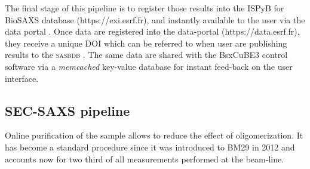 \documentclass[preprint]{iucr}              %
\begin{document}


The final stage of this pipeline is to register those results into the ISPyB for BioSAXS database \cite{ISPYBB} (https://exi.esrf.fr), and instantly available to the user via the data portal \cite{data-portal}. 
Once data are registered into the data-portal (https://data.esrf.fr), they receive a unique DOI which can be referred to when user are publishing results to the \textsc{sasbdb} \cite{sasbdb}.
The same data are shared with the BsxCuBE3 control software via a \textit{memcached} key-value database for instant feed-back on the user interface.

\subsection{SEC-SAXS pipeline}
Online purification of the sample allows to reduce the effect of oligomerization.
It has become a standard procedure since it was introduced to BM29 in 2012 \cite{SECPaper2012} and accounts now for two third of all measurements performed at the beam-line.
\end{document}
